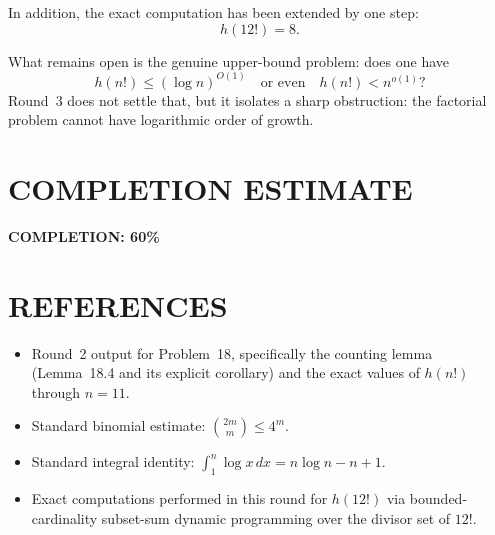 In addition, the exact computation has been extended by one step:
\[
h(12!)=8.
\]

What remains open is the genuine upper-bound problem: does one have
\[
h(n!)\le (\log n)^{O(1)}
\quad\text{or even}\quad
h(n!)<n^{o(1)}?
\]
Round~3 does not settle that, but it isolates a sharp obstruction: the factorial problem cannot have logarithmic order of growth.

\section{COMPLETION ESTIMATE}

\textbf{COMPLETION: 60\%}

\section{REFERENCES}

\begin{itemize}
\item Round~2 output for Problem~18, specifically the counting lemma (Lemma~18.4 and its explicit corollary) and the exact values of \(h(n!)\) through \(n=11\).
\item Standard binomial estimate: \(\binom{2m}{m}\le 4^m\).
\item Standard integral identity: \(\int_1^n \log x\,dx = n\log n-n+1\).
\item Exact computations performed in this round for \(h(12!)\) via bounded-cardinality subset-sum dynamic programming over the divisor set of \(12!\).
\end{itemize}

